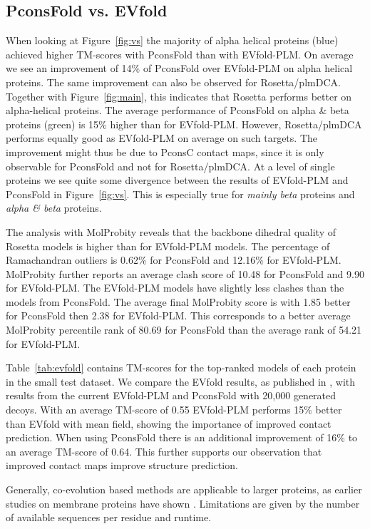 \documentclass{bioinfo}
\begin{document}
\subsection{PconsFold vs. EVfold }

When looking at Figure~\ref{fig:vs} the majority of alpha helical
proteins (blue) achieved higher TM-scores with PconsFold than with
EVfold-PLM. On average we see an improvement of 14\% of PconsFold over
EVfold-PLM on alpha helical proteins. The same improvement can also be
observed for Rosetta/plmDCA. Together with Figure~\ref{fig:main},
this indicates that Rosetta performs better on alpha-helical
proteins. The average
performance of PconsFold on alpha \& beta proteins (green) is 15\%
higher than for EVfold-PLM. However, Rosetta/plmDCA performs equally good
as EVfold-PLM on average on such targets. The improvement might thus be
due to PconsC contact maps, since it is only observable for PconsFold
and not for Rosetta/plmDCA. At a level of single proteins we see quite
some divergence between the results of EVfold-PLM and PconsFold in
Figure~\ref{fig:vs}. This is especially true for {\em mainly beta}
proteins and {\em alpha \& beta} proteins.

The analysis with MolProbity reveals that the backbone dihedral
quality of Rosetta models is higher than for EVfold-PLM models. The
percentage of Ramachandran outliers is 0.62\% for PconsFold and
12.16\% for EVfold-PLM. MolProbity further reports an average clash
score of 10.48 for PconsFold and 9.90 for EVfold-PLM. The EVfold-PLM
models have slightly less clashes than the models from PconsFold. The
average final MolProbity score is with 1.85 better for PconsFold then
2.38 for EVfold-PLM. This corresponds to a better average MolProbity
percentile rank of 80.69 for PconsFold than the average rank of 54.21
for EVfold-PLM.


Table~\ref{tab:evfold} contains TM-scores for the top-ranked models of
each protein in the small test dataset. We compare the EVfold results,
as published in \citeauthor{marks_protein_2011}
\citeyear{marks_protein_2011}, with results from the current EVfold-PLM
and PconsFold with 20,000 generated decoys. With an average TM-score of 0.55
EVfold-PLM performs 15\% better than EVfold with mean field,
showing the importance of improved contact prediction. When using
PconsFold there is an additional improvement of 16\% to an average
TM-score of 0.64. This further supports our observation that improved
contact maps improve structure prediction.

{\color{red}Generally, co-evolution based methods are applicable to larger proteins, as
earlier studies on membrane proteins have shown
\cite[]{hopf_three-dimensional_2012, nugent_accurate_2012}. Limitations
are given by the number of available sequences per residue
\cite[]{hopf_three-dimensional_2012, kamisetty_assessing_2013} and runtime.}
\end{document}
